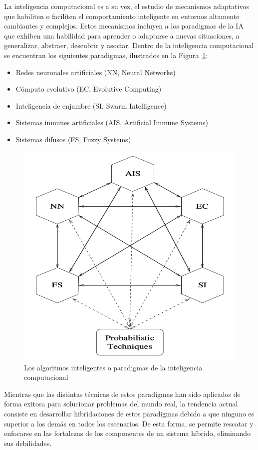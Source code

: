 \documentclass{article}
\begin{document}
La inteligencia computacional es a su vez, el estudio de mecanismos adaptativos que habiliten o faciliten el comportamiento inteligente en entornos altamente cambiantes y complejos.
Estos mecanismos incluyen a los paradigmas de la IA que exhiben una habilidad para aprender o adaptarse a nuevas situaciones, a generalizar, abstraer, descubrir y asociar.
Dentro de la inteligencia computacional se encuentran los siguientes paradigmas, ilustrados en la Figura~\ref{fig:paradigmas-inteligencia-computacional}:
\begin{itemize}
	\item Redes neuronales artificiales (NN, Neural Networks)
	\item Cómputo evolutivo (EC, Evolutive Computing)
	\item Inteligencia de enjambre (SI, Swarm Intelligence)
	\item Sistemas inmunes artificiales (AIS, Artificial Immune Systems)
	\item Sistemas difusos (FS, Fuzzy Systems)
\end{itemize}

\begin{figure}[tb]
	\centering
	\includegraphics[scale=0.35]{../resources/paradigmas-inteligencia-computacional}
	\caption{Los algoritmos inteligentes o paradigmas de la inteligencia computacional}
	\label{fig:paradigmas-inteligencia-computacional}
\end{figure}
Mientras que las distintas técnicas de estos paradigmas han sido aplicados de forma exitosa para solucionar problemas del mundo real, la tendencia actual consiste en desarrollar hibridaciones de estos paradigmas debido a que ninguno es superior a los demás en todos los escenarios.
De esta forma, se permite rescatar y enfocarse en las fortalezas de los componentes de un sistema híbrido, eliminando sus debilidades.
\end{document}
